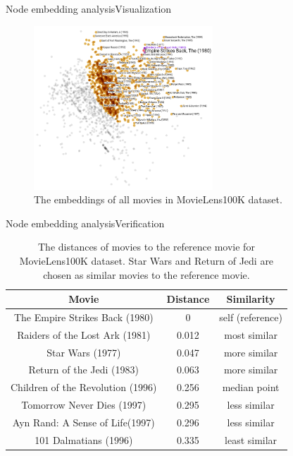 \documentclass{beamer}
\begin{document}
\begin{frame}{Node embedding analysis}{Visualization}
	\begin{figure}[!ht]\centering
		\includegraphics[width=0.6\textwidth]{movies-annotation}
		\caption{
			The embeddings of all movies in MovieLens100K dataset.
		}
		\label{fig:movies}
	\end{figure}
\end{frame}

\begin{frame}{Node embedding analysis}{Verification}
	\begin{table}[!ht]\centering
		\caption{
			The distances of movies to the reference movie for MovieLens100K dataset. Star Wars and Return of Jedi are chosen as similar movies to the reference movie.
		}
		\begin{tabular}{ccc} \hline
			Movie & Distance & Similarity \\ \hline
			The Empire Strikes Back (1980) & 0 & self (reference) \\ \hline
			Raiders of the Lost Ark (1981) & 0.012 & most similar \\ \hline
			Star Wars (1977) & 0.047 & more similar \\ \hline
			Return of the Jedi (1983) & 0.063 & more similar \\ \hline
			Children of the Revolution (1996) & 0.256 & median point \\ \hline
			Tomorrow Never Dies (1997) & 0.295 & less similar \\ \hline
			Ayn Rand: A Sense of Life(1997) & 0.296 & less similar \\ \hline
			101 Dalmatians (1996) & 0.335 & least similar \\ \hline
		\end{tabular}
		\label{tab:movielens100k-distance}
	\end{table}
\end{frame}
\end{document}
